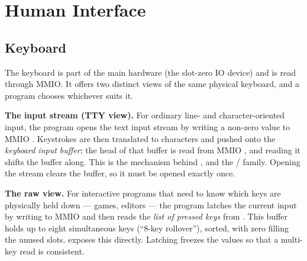\begin{outline}
\1
 \2
 \2
\1
\1
\1
\1
 \2
 \2
\1
\1
\end{outline}



\chapter{Human Interface}


\section{Keyboard}

The keyboard is part of the main hardware (the slot-zero IO device) and is read through MMIO. It offers two distinct views of the same physical keyboard, and a program chooses whichever suits it.

\textbf{The input stream (TTY view).} For ordinary line- and character-oriented input, the program opens the text input stream by writing a non-zero value to MMIO . Keystrokes are then translated to characters and pushed onto the \emph{keyboard input buffer}; the head of that buffer is read from MMIO , and reading it shifts the buffer along. This is the mechanism behind ,  and the / family. Opening the stream clears the buffer, so it must be opened exactly once.

\textbf{The raw view.} For interactive programs that need to know which keys are physically held down --- games, editors --- the program latches the current input by writing to MMIO  and then reads the \emph{list of pressed keys} from . This buffer holds up to eight simultaneous keys (``8-key rollover''), sorted, with zero filling the unused slots.  exposes this directly. Latching freezes the values so that a multi-key read is consistent.

